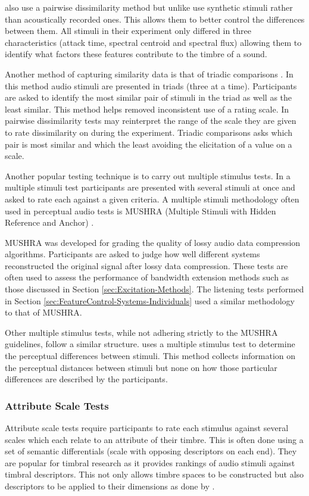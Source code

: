 			\citet{caclin2005acoustic} also use a pairwise dissimilarity method but unlike
			\citet{grey1977multidimensional} use synthetic stimuli rather than acoustically recorded ones. This
			allows them to better control the differences between them. All stimuli in their experiment only
			differed in three characteristics (attack time, spectral centroid and spectral flux) allowing them
			to identify what factors these features contribute to the timbre of a sound.

			Another method of capturing similarity data is that of triadic comparisons
			\citep{wickelmaier2007deriving}.  In this method audio stimuli are presented in triads (three at a
			time).  Participants are asked to identify the most similar pair of stimuli in the triad as well as
			the least similar. This method helps removed inconsistent use of a rating scale. In pairwise
			dissimilarity tests may reinterpret the range of the scale they are given to rate dissimilarity on
			during the experiment. Triadic comparisons asks which pair is most similar and which the least
			avoiding the elicitation of a value on a scale.

			Another popular testing technique is to carry out multiple stimulus tests. In a multiple stimuli
			test participants are presented with several stimuli at once and asked to rate each against a given
			criteria. A multiple stimuli methodology often used in perceptual audio tests is MUSHRA (Multiple
			Stimuli with Hidden Reference and Anchor) \citep{mushra2014}. 

			MUSHRA was developed for grading the quality of lossy audio data compression algorithms.
			Participants are asked to judge how well different systems reconstructed the original signal after
			lossy data compression.  These tests are often used to assess the performance of bandwidth
			extension methods such as those discussed in Section \ref{sec:Excitation-Methods}. The listening
			tests performed in Section \ref{sec:FeatureControl-Systems-Individuals} used a similar methodology
			to that of MUSHRA.

			Other multiple stimulus tests, while not adhering strictly to the MUSHRA guidelines, follow a
			similar structure. \citet{arthi2015influence} uses a multiple stimulus test to determine the
			perceptual differences between stimuli. This method collects information on the perceptual
			distances between stimuli but none on how those particular differences are described by the
			participants.

		\subsubsection*{Attribute Scale Tests}
			Attribute scale tests require participants to rate each stimulus against several scales which each
			relate to an attribute of their timbre. This is often done using a set of semantic differentials
			(scale with opposing descriptors on each end). They are popular for timbral research as it provides
			rankings of audio stimuli against timbral descriptors. This not only allows timbre spaces to be
			constructed but also descriptors to be applied to their dimensions as done by
			\citet{zacharakis2014an}.

